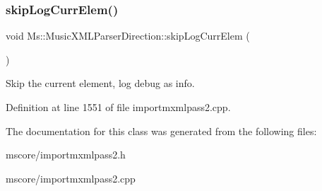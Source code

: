 \subsubsection{\texorpdfstring{skip\+Log\+Curr\+Elem()}{skipLogCurrElem()}}
{\footnotesize\ttfamily void Ms\+::\+Music\+X\+M\+L\+Parser\+Direction\+::skip\+Log\+Curr\+Elem (\begin{DoxyParamCaption}{ }\end{DoxyParamCaption})}

Skip the current element, log debug as info. 

Definition at line 1551 of file importmxmlpass2.\+cpp.



The documentation for this class was generated from the following files\+:\begin{DoxyCompactItemize}
\item 
mscore/importmxmlpass2.\+h\item 
mscore/importmxmlpass2.\+cpp\end{DoxyCompactItemize}

